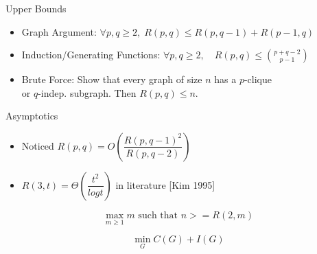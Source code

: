 \documentclass[letterpaper,12pt]{article}
\theoremstyle{plain}
\theoremstyle{definition}
\theoremstyle{remark}
\theoremstyle{definition}
\begin{document}
Upper Bounds
\begin{itemize}
\item Graph Argument: $\forall p,q \geq 2, \; R(p,q) \leq R(p,q-1) + R(p-1,q)$
\item Induction/Generating Functions: $\forall p,q \geq 2, \quad R(p,q) \leq \binom{p+q-2}{p-1}$
\item Brute Force: Show that every graph of size $n$ has a $p$-clique \\
\phantom{Brute Force:} or $q$-indep. subgraph. Then $R(p,q) \leq n$.
\end{itemize}

Asymptotics
\begin{itemize}
\item Noticed $R(p,q) = O\left(\dfrac{R(p,q-1)^2}{R(p,q-2)}\right)$
\item $R(3,t) = \Theta\left(\dfrac{t^2}{log t}\right)$ in literature [Kim 1995]
\end{itemize}

\[ 
\max_{m \geq 1} m \text{ such that } n >= R(2,m)
\]

\[
\min_G C(G) + I(G)
\]

%
%
\end{document}
